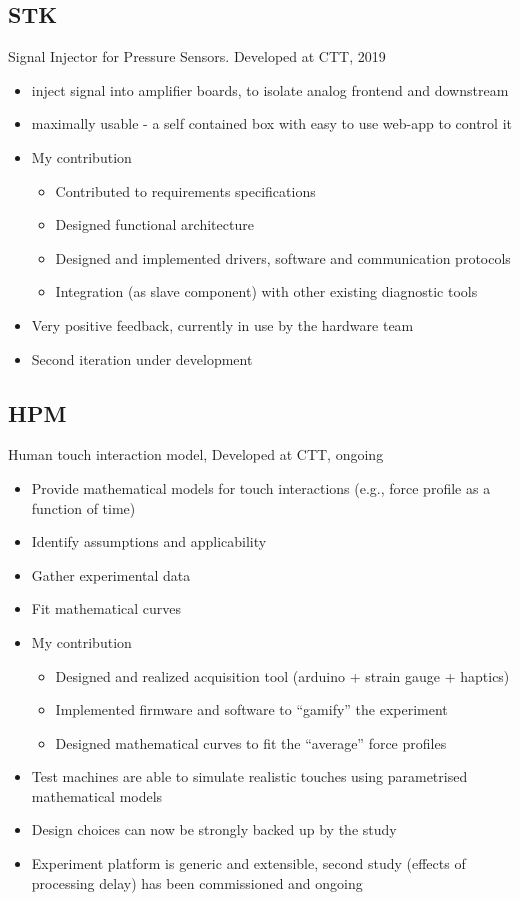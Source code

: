 \documentclass{if-beamer}
\begin{document}
\subsection{STK}
\begin{frame}
Signal Injector for Pressure Sensors. Developed at CTT, 2019

\begin{itemize}
\item inject signal into amplifier boards, to isolate analog frontend and downstream
\item maximally usable - a self contained box with easy to use web-app to control it
\item My contribution
\begin{itemize}
\item Contributed to requirements specifications
\item Designed functional architecture
\item Designed and implemented drivers, software and communication protocols
\item Integration (as slave component) with other existing diagnostic tools
\end{itemize}
\item Very positive feedback, currently in use by the hardware team
\item Second iteration under development
\end{itemize}
\end{frame}


\subsection{HPM}
\begin{frame}

Human touch interaction model, Developed at CTT, ongoing

\begin{itemize}
\item Provide mathematical models for touch interactions (e.g., force profile as a function of time)
\item Identify assumptions and applicability
\item Gather experimental data
\item Fit mathematical curves
\item My contribution
\begin{itemize}
\item Designed and realized acquisition tool (arduino + strain gauge + haptics)
\item Implemented firmware and software to ``gamify'' the experiment
\item Designed mathematical curves to fit the ``average'' force profiles
\end{itemize}
\item Test machines are able to simulate realistic touches using parametrised mathematical models
\item Design choices can now be strongly backed up by the study
\item Experiment platform is generic and extensible, second study (effects of processing delay) has been commissioned and ongoing
\end{itemize}
\end{frame}
\end{document}
